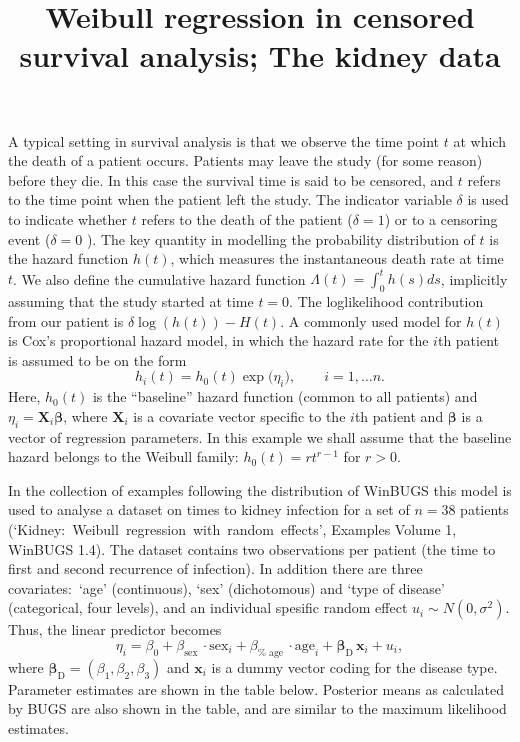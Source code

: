 \documentclass[10pt]{article}
\begin{document}
\title{Weibull regression in censored survival analysis; The kidney data}
\author{}
\maketitle

A typical setting in survival analysis is that we observe the time point $t$
at which the death of a patient occurs. Patients may leave the study (for
some reason) before they die. In this case the survival time is said to be
censored, and $t$ refers to the time point when the patient left the study.
The indicator variable $\delta $ is used to indicate whether $t$ refers to
the death of the patient ($\delta =1$) or to a censoring event ($\delta =0$%
). The key quantity in modelling the probability distribution of $t$ is the
hazard function $h(t)$, which measures the instantaneous death rate at time $%
t$. We also define the cumulative hazard function $\Lambda
(t)=\int_{0}^{t}h(s)ds$, implicitly assuming that the study started at time $%
t=0$. The loglikelihood contribution from our patient is $\delta \log
(h(t))-H(t)$. A commonly used model for $h(t)$ is Cox's proportional hazard
model, in which the hazard rate for the $i$th patient is assumed to be on
the form%
\[
h_{i}(t)=h_{0}(t)\exp (\eta _{i}\mathbf{),\qquad }i=1,\ldots n.
\]%
Here, $h_{0}(t)$ is the ``baseline'' hazard function (common to all
patients) and $\eta _{i}=\mathbf{X}_{i}\mathbf{\beta }$, where $\mathbf{X}%
_{i}$ is a covariate vector specific to the $i$th patient and $\mathbf{\beta 
}$ is a vector of regression parameters. In this example we shall assume
that the baseline hazard belongs to the Weibull family: $h_{0}(t)=rt^{r-1}$
for $r>0$.

In the collection of examples following the distribution of WinBUGS this
model is used to analyse a dataset on times to kidney infection for a set of 
$n=38$ patients (`Kidney:~Weibull~regression~with~random~effects', Examples
Volume 1, WinBUGS 1.4). The dataset contains two observations per patient
(the time to first and second recurrence of infection). In addition there
are three covariates:\ `age' (continuous), `sex' (dichotomous) and `type of
disease' (categorical, four levels), and an individual spesific random
effect $u_{i}\sim N(0,\sigma ^{2})$. Thus, the linear predictor becomes%
\begin{equation}
\eta _{i}=\beta _{0}+\beta _{\text{sex}}\,\cdot \text{sex}_{i}+\beta _{\text{%
age}}\,\cdot \text{age}_{i}+\mathbf{\beta }_{\text{D}}\,\mathbf{x}_{i}+u_{i},
\label{eta_survival}
\end{equation}%
where $\mathbf{\beta }_{\text{D}}=(\beta _{1},\beta _{2},\beta _{3})$ and $%
\mathbf{x}_{i}$ is a dummy vector coding for the disease type. Parameter
estimates are shown in the table below. Posterior means as calculated by
BUGS are also shown in the table, and are similar to the maximum likelihood
estimates.
\end{document}
